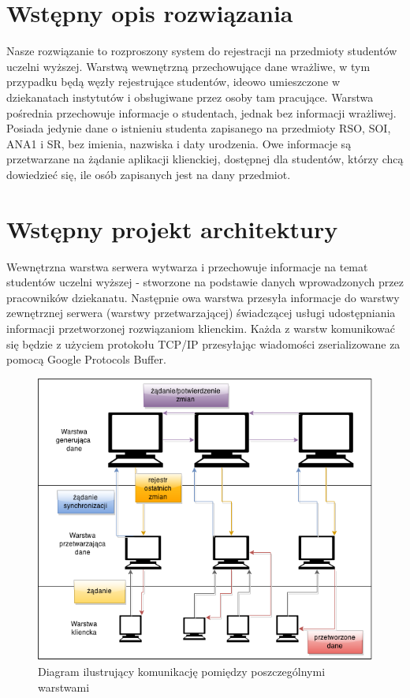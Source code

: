 \section[Wstępny opis rozwiązania]{Wstępny opis rozwiązania}

\par{Nasze rozwiązanie to rozproszony system do rejestracji na przedmioty studentów uczelni wyższej. Warstwą wewnętrzną przechowujące dane wrażliwe, w tym przypadku będą węzły rejestrujące studentów, ideowo umieszczone w dziekanatach instytutów i obsługiwane przez osoby tam pracujące. Warstwa pośrednia przechowuje informacje o studentach, jednak bez informacji wrażliwej. Posiada jedynie dane o istnieniu studenta zapisanego na przedmioty RSO, SOI, ANA1 i SR,  bez imienia, nazwiska i daty urodzenia. Owe informacje są przetwarzane na żądanie aplikacji klienckiej, dostępnej dla studentów, którzy chcą dowiedzieć się, ile osób zapisanych jest na dany przedmiot.}

\section[Wstępny projekt architektury]{Wstępny projekt architektury}

\par{Wewnętrzna warstwa serwera wytwarza i przechowuje informacje na temat studentów uczelni wyższej - stworzone na podstawie danych wprowadzonych przez pracowników dziekanatu. Następnie owa warstwa przesyła informacje do warstwy zewnętrznej serwera (warstwy przetwarzającej) świadczącej usługi udostępniania informacji przetworzonej rozwiązaniom klienckim. Każda z warstw komunikować się będzie z użyciem protokołu TCP/IP przesyłając wiadomości zserializowane za pomocą Google Protocols Buffer.}

\begin{figure}[h]
\begin{center}
\includegraphics[width=0.9\linewidth]{img/dane_net.png} 
\caption{Diagram ilustrujący komunikację pomiędzy poszczególnymi warstwami}
\label{img:dane_net}
\end{center}
\end{figure}

